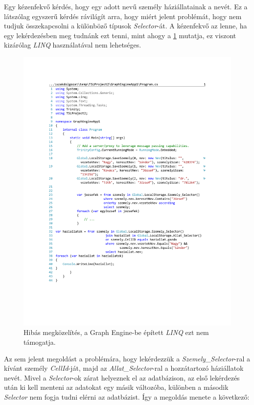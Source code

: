 Egy kézenfekvő kérdés, hogy egy adott nevű személy háziállatainak a nevét. Ez a látszólag egyszerű kérdés rávilágít arra, hogy miért jelent problémát, hogy nem tudjuk összekapcsolni a különböző típusok \emph{Selector}-át. A kézenfekvő az lenne, ha egy lekérdezésben meg tudnánk ezt tenni, mint ahogy a \ref{fig:Haziallatok} mutatja, ez viszont kizárólag \emph{LINQ} használatával nem lehetséges.

\begin{figure}[H]
	\centering
	\includegraphics[]{figures/HaziallatokLINQ.pdf}
	\caption{Hibás megközelítés, a Graph Engine-be épített \emph{LINQ} ezt nem támogatja.}
	\label{fig:Haziallatok}
\end{figure}

Az sem jelent megoldást a problémára, hogy lekérdezzük a \emph{Szemely\_Selector}-ral a kívánt személy \emph{CellId}-ját, majd az \emph{Allat\_Selector}-ral a hozzátartozó háziállatok nevét. Mivel a \emph{Selector}-ok zárat helyeznek el az adatbázison, az első lekérdezés után ki kell menteni az adatokat egy másik változóba, különben a második \emph{Selector} nem fogja tudni elérni az adatbázist. Így a megoldás menete a következő:

